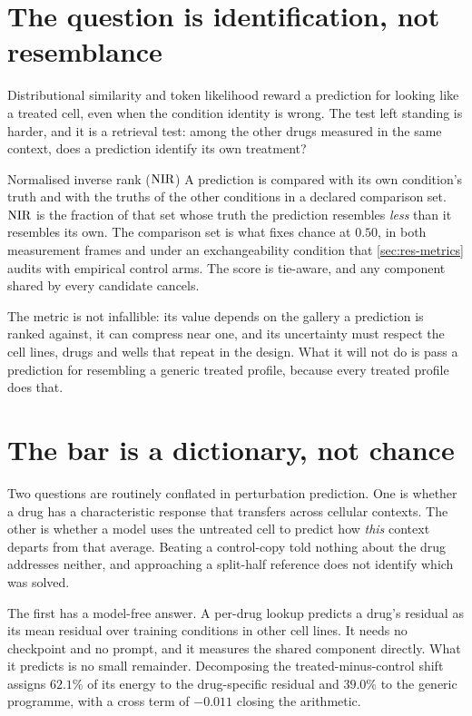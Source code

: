 \section{The question is identification, not resemblance}
\label{sec:intro-question}

Distributional similarity and token likelihood reward a prediction for looking
like a treated cell, even when the condition identity is wrong. The test left
standing is harder, and it is a retrieval test: among the other drugs measured
in the same context, does a prediction identify its own treatment?

\begin{defn}{Normalised inverse rank ($\textrm{NIR}$)}
A prediction is compared with its own condition's truth and with the truths of
the other conditions in a declared comparison set. $\textrm{NIR}$ is the fraction of that
set whose truth the prediction resembles \emph{less} than it resembles its own.
The comparison set is what fixes chance at $0.50$, in both measurement frames and
under an exchangeability condition that \cref{sec:res-metrics} audits with
empirical control arms. The score is tie-aware, and any component shared by every
candidate cancels.
\end{defn}

The metric is not infallible: its value depends on the gallery a prediction is
ranked against, it can compress near one, and its uncertainty must respect the
cell lines, drugs and wells that repeat in the design. What it will not do is
pass a prediction for resembling a generic treated profile, because every
treated profile does that.

\section{The bar is a dictionary, not chance}
\label{sec:intro-bar}

Two questions are routinely conflated in perturbation prediction. One is whether
a drug has a characteristic response that transfers across cellular contexts.
The other is whether a model uses the untreated cell to predict how \emph{this}
context departs from that average. Beating a control-copy told nothing about the
drug addresses neither, and approaching a split-half reference does not identify
which was solved.

The first has a model-free answer. A per-drug lookup predicts a
drug's residual as its mean residual over training conditions in other cell
lines. It needs no checkpoint and no prompt, and it measures the shared
component directly. What it predicts is no small remainder.
Decomposing the treated-minus-control shift assigns $62.1\%$ of its energy to
the drug-specific residual and $39.0\%$ to the generic programme, with a cross
term of $-0.011$ closing the arithmetic.

